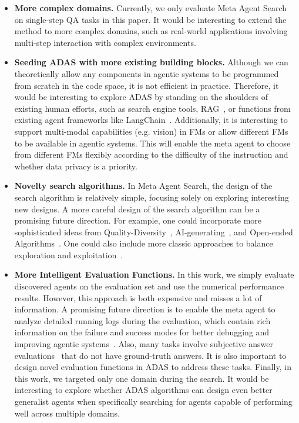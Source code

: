 \documentclass{article}
\newcommand{\problem}{ADAS\xspace}
\newcommand{\ouralgo}{Meta Agent Search\xspace}
\begin{document}
\begin{itemize}[label=\large\textbullet, left=0pt]
\item \noindent\textbf{More complex domains.}\hspace{0.3em} Currently, we only evaluate \ouralgo on single-step QA tasks in this paper. It would be interesting to extend the method to more complex domains, such as real-world applications involving multi-step interaction with complex environments.

\item \noindent\textbf{Seeding \problem with more existing building blocks.}\hspace{0.3em} Although we can theoretically allow any components in agentic systems to be programmed from scratch in the code space, it is not efficient in practice. Therefore, it would be interesting to explore \problem by standing on the shoulders of existing human efforts, such as search engine tools, RAG~\citep{lewis2020rag}, or functions from existing agent frameworks like LangChain~\citep{langchain}. Additionally, it is interesting to support multi-modal capabilities (e.g. vision) in FMs or allow different FMs to be available in agentic systems. This will enable the meta agent to choose from different FMs flexibly according to the difficulty of the instruction and whether data privacy is a priority.


\item \noindent\textbf{Novelty search algorithms.}\hspace{0.3em}  In \ouralgo, the design of the search algorithm is relatively simple, focusing solely on exploring interesting new designs. A more careful design of the search algorithm can be a promising future direction. For example, one could incorporate more sophisticated ideas from Quality-Diversity~\citep{mouret2015illuminating,cully2017quality}, AI-generating~\citep{clune2019aigas}, and Open-ended Algorithms~\citep{faldor2024omni,zhang2024omni,stanley2015greatness,stanley2019designing}. One could also include more classic approaches to balance exploration and exploitation~\citep{sutton2018reinforcement,liu2024evolution}. 

\item \noindent\textbf{More Intelligent Evaluation Functions.}\hspace{0.3em} In this work, we simply evaluate discovered agents on the evaluation set and use the numerical performance results. However, this approach is both expensive and misses a lot of information. A promising future direction is to enable the meta agent to analyze detailed running logs during the evaluation, which contain rich information on the failure and success modes for better debugging and improving agentic systems~\citep{zhou2024symbolic}. Also, many tasks involve subjective answer evaluations~\citep{chiang2024arena,lu2024aiscientist} that do not have ground-truth answers. It is also important to design novel evaluation functions in \problem to address these tasks. Finally, in this work, we targeted only one domain during the search. It would be interesting to explore whether \problem algorithms can design even better generalist agents when specifically searching for agents capable of performing well across multiple domains.


\end{itemize}
\end{document}

